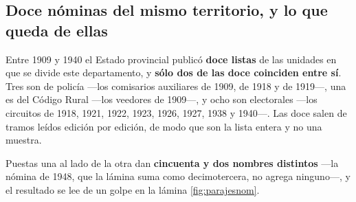 \subsection*{Doce nóminas del mismo territorio, y lo que queda de ellas}

Entre 1909 y 1940 el Estado provincial publicó \textbf{doce listas} de las unidades en que se
divide este departamento, y \textbf{sólo dos de las doce coinciden entre sí}. Tres son de policía ---los
comisarios auxiliares de 1909, de 1918 y de 1919---, una es del Código Rural ---los veedores de
1909---, y ocho son electorales ---los circuitos de 1918, 1921, 1922, 1923, 1926, 1927, 1938 y 1940---. Las doce
salen de tramos leídos edición por edición, de modo que son la lista entera y no una muestra.

Puestas una al lado de la otra dan \textbf{cincuenta y dos nombres distintos} ---la nómina de 1948, que la lámina suma como decimotercera, no agrega ninguno---, y el resultado se
lee de un golpe en la lámina \ref{fig:parajesnom}.


